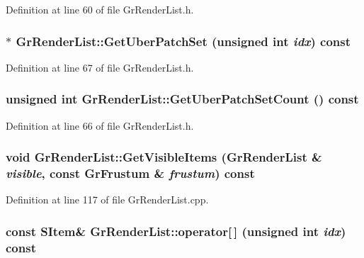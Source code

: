 Definition at line 60 of file GrRenderList.h.\hypertarget{class_gr_render_list_7c282cfed443280511a80ccd88f8304b}{
\subsubsection[{GetUberPatchSet}]{$\ast$ GrRenderList::GetUberPatchSet (unsigned int {\em idx}) const}}
\label{class_gr_render_list_7c282cfed443280511a80ccd88f8304b}




Definition at line 67 of file GrRenderList.h.\hypertarget{class_gr_render_list_4ec857347bb48be6ad445b60a96c230c}{
\subsubsection[{GetUberPatchSetCount}]{\setlength{\rightskip}{0pt plus 5cm}unsigned int GrRenderList::GetUberPatchSetCount () const}}
\label{class_gr_render_list_4ec857347bb48be6ad445b60a96c230c}




Definition at line 66 of file GrRenderList.h.\hypertarget{class_gr_render_list_5715a8ea1fbcc22a26c0fe2bea0cd852}{
\subsubsection[{GetVisibleItems}]{\setlength{\rightskip}{0pt plus 5cm}void GrRenderList::GetVisibleItems ({\bf GrRenderList} \& {\em visible}, \/  const {\bf GrFrustum} \& {\em frustum}) const}}
\label{class_gr_render_list_5715a8ea1fbcc22a26c0fe2bea0cd852}




Definition at line 117 of file GrRenderList.cpp.\hypertarget{class_gr_render_list_c5c2ce6c9a0dffefad11be6a66560d1f}{
\subsubsection[{operator[]}]{\setlength{\rightskip}{0pt plus 5cm}const {\bf SItem}\& GrRenderList::operator\mbox{[}$\,$\mbox{]} (unsigned int {\em idx}) const}}
\label{class_gr_render_list_c5c2ce6c9a0dffefad11be6a66560d1f}





